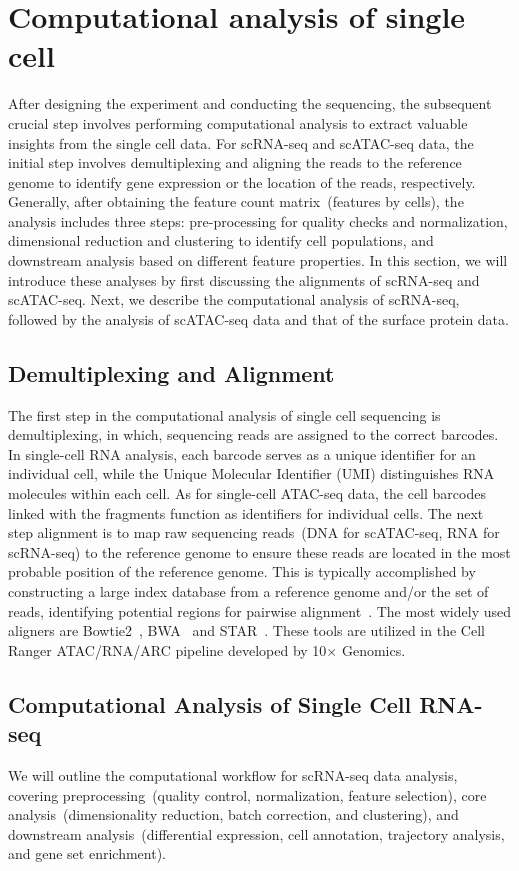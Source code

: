 \section{Computational analysis of single cell}
\label{background:computational_singlecell}
After designing the experiment and conducting the sequencing, the subsequent crucial step involves performing computational analysis to extract valuable insights from the single cell data. For scRNA-seq and scATAC-seq data, the initial step involves demultiplexing and aligning the reads to the reference genome to identify gene expression or the location of the reads, respectively. Generally, after obtaining the feature count matrix~(features by cells), the analysis includes three steps: pre-processing for quality checks and normalization, dimensional reduction and clustering to identify cell populations, and downstream analysis based on different feature properties. In this section, we will introduce these analyses by first discussing the alignments of scRNA-seq and scATAC-seq. Next, we describe the computational analysis of scRNA-seq, followed by the analysis of scATAC-seq data and that of the surface protein data.

\subsection{Demultiplexing and Alignment}
\label{background:sec2:alignment}
The first step in the computational analysis of single cell sequencing is demultiplexing, in which, sequencing reads are assigned to the correct barcodes. In single-cell RNA analysis, each barcode serves as a unique identifier for an individual cell, while the Unique Molecular Identifier (UMI) distinguishes RNA molecules within each cell. As for single-cell ATAC-seq data, the cell barcodes linked with the fragments function as identifiers for individual cells. The next step alignment is to map raw sequencing reads~(DNA for scATAC-seq, RNA for scRNA-seq) to the reference genome to ensure these reads are located in the most probable position of the reference genome. This is typically accomplished by constructing a large index database from a reference genome and/or the set of reads, identifying potential regions for pairwise alignment~\citep{alser2021alignment}. The most widely used aligners are Bowtie2~\citep{langmead2012bowtie2}, BWA~\citep{li2009BWA} and STAR~\citep{dobin2013star}. These tools are utilized in the Cell Ranger ATAC/RNA/ARC pipeline developed by 10$\times$ Genomics.

\subsection{Computational Analysis of Single Cell RNA-seq}
\label{background:sec2:scRNA}
We will outline the computational workflow for scRNA-seq data analysis, covering preprocessing~(quality control, normalization, feature selection), core analysis~(dimensionality reduction, batch correction, and clustering), and downstream analysis~(differential expression, cell annotation, trajectory analysis, and gene set enrichment).

